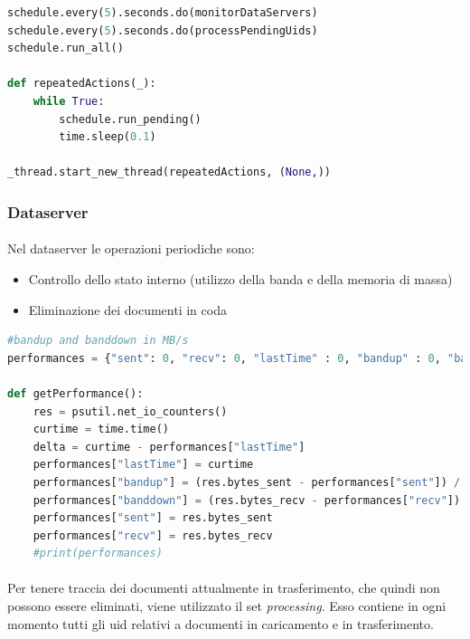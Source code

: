\documentclass{article}
\begin{document}
\begin{lstlisting}[language=Python, title=Scheduling ed esecuzione]
schedule.every(5).seconds.do(monitorDataServers)
schedule.every(5).seconds.do(processPendingUids)
schedule.run_all()

def repeatedActions(_):
    while True:
        schedule.run_pending()
        time.sleep(0.1)

_thread.start_new_thread(repeatedActions, (None,))
\end{lstlisting}


\subsubsection{Dataserver}

\paragraph{} Nel dataserver le operazioni periodiche sono:\begin{itemize}
	\item Controllo dello stato interno (utilizzo della banda e della memoria di massa)
	\item Eliminazione dei documenti in coda
\end{itemize}


\begin{lstlisting}[language=Python, title=Controllo dello stato interno]
#bandup and banddown in MB/s
performances = {"sent": 0, "recv": 0, "lastTime" : 0, "bandup" : 0, "banddown" : 0}

def getPerformance():
    res = psutil.net_io_counters()
    curtime = time.time()
    delta = curtime - performances["lastTime"]
    performances["lastTime"] = curtime
    performances["bandup"] = (res.bytes_sent - performances["sent"]) / delta / 1000000
    performances["banddown"] = (res.bytes_recv - performances["recv"]) / delta / 1000000
    performances["sent"] = res.bytes_sent
    performances["recv"] = res.bytes_recv
    #print(performances)
\end{lstlisting}


\paragraph{} Per tenere traccia dei documenti attualmente in trasferimento, che quindi non possono essere eliminati, viene utilizzato il set \emph{processing}. Esso contiene in ogni momento tutti gli uid relativi a documenti in caricamento e in trasferimento. 
\end{document}
